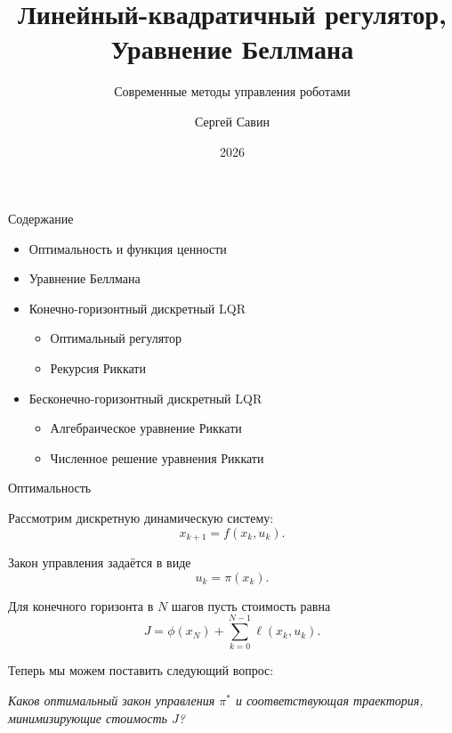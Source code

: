 \documentclass{beamer}
\subtitle{Современные методы управления роботами}
\author{Сергей Савин}
\date{2026}
\title{Линейный-квадратичный регулятор, Уравнение Беллмана}
\begin{document}
	\maketitle
	
	
	\begin{frame}{Содержание}
		\begin{itemize}
			\item Оптимальность и функция ценности
			\item Уравнение Беллмана
			\item Конечно-горизонтный дискретный LQR
			\begin{itemize}
				\item Оптимальный регулятор
				\item Рекурсия Риккати
			\end{itemize}
			\item Бесконечно-горизонтный дискретный LQR
			\begin{itemize}
				\item Алгебраическое уравнение Риккати
				\item Численное решение уравнения Риккати
			\end{itemize}
		\end{itemize}
	\end{frame}
	
	
	
	\begin{frame}{Оптимальность}
		\begin{flushleft}
			
			Рассмотрим дискретную динамическую систему:
			\[
			x_{k+1}=f(x_k,u_k).
			\]
			
			Закон управления задаётся в виде
			\[
			u_k=\pi(x_k).
			\]
			
			Для конечного горизонта в $N$ шагов пусть стоимость равна
			\[
			J=\phi(x_N)+\sum_{k=0}^{N-1}\ell(x_k,u_k).
			\]
			
			\medskip
			
			Теперь мы можем поставить следующий вопрос:
			
			\medskip
			
			\emph{Каков оптимальный закон управления $\pi^*$ и
				соответствующая траектория, минимизирующие стоимость $J$?}
			
		\end{flushleft}
	\end{frame}
	
\end{document}

